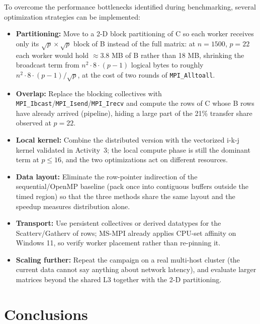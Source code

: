\documentclass[12pt,a4paper]{article}
\begin{document}
To overcome the performance bottlenecks identified during benchmarking,
several optimization strategies can be implemented:
\begin{itemize}
\item \textbf{Partitioning:} Move to a 2-D block partitioning of C so each
worker receives only its $\sqrt{p} \times \sqrt{p}$ block of B instead of
the full matrix: at $n = 1500$, $p = 22$ each worker would hold
$\approx$3.8 MB of B rather than 18 MB, shrinking the broadcast term from
$n^2 \cdot 8 \cdot (p-1)$ logical bytes to roughly
$n^2 \cdot 8 \cdot (p-1)/\sqrt{p}$, at the cost of two rounds of
\texttt{MPI\_Alltoall}.
\item \textbf{Overlap:} Replace the blocking collectives with
\texttt{MPI\_Ibcast}/\texttt{MPI\_Isend}/\texttt{MPI\_Irecv} and compute the
rows of C whose B rows have already arrived (pipeline), hiding a large part
of the 21\% transfer share observed at $p = 22$.
\item \textbf{Local kernel:} Combine the distributed version with the
vectorized i-k-j kernel validated in Activity~3; the local compute phase is
still the dominant term at $p \leq 16$, and the two optimizations act on
different resources.
\item \textbf{Data layout:} Eliminate the row-pointer indirection of the
sequential/OpenMP baseline (pack once into contiguous buffers outside the
timed region) so that the three methods share the same layout and the
speedup measures distribution alone.
\item \textbf{Transport:} Use persistent collectives or derived datatypes
for the Scatterv/Gatherv of rows; MS-MPI already applies CPU-set affinity
on Windows 11, so verify worker placement rather than re-pinning it.
\item \textbf{Scaling further:} Repeat the campaign on a real multi-host
cluster (the current data cannot say anything about network latency), and
evaluate larger matrices beyond the shared L3 together with the 2-D
partitioning.
\end{itemize}

\section{Conclusions}
\label{sec:concl}
\end{document}
